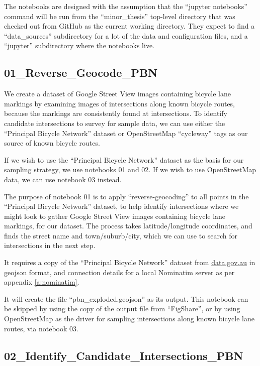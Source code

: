 \documentclass[11pt,twoside]{report}
\begin{document}
The notebooks are designed with the assumption that the ``jupyter notebooks'' command will be run from the ``minor\_thesis'' top-level directory that was checked out from GitHub as the current working directory.  They expect to find a ``data\_sources'' subdirectory for a lot of the data and configuration files, and a ``jupyter'' subdirectory where the notebooks live.

\subsection{01\_Reverse\_Geocode\_PBN}
\label{aj01}

We create a dataset of Google Street View images containing bicycle lane markings by examining images of intersections along known bicycle routes, because the markings are consistently found at intersections.  To identify candidate intersections to survey for sample data, we can use either the ``Principal Bicycle Network'' dataset or OpenStreetMap ``cycleway'' tags as our source of known bicycle routes.

If we wish to use the ``Principal Bicycle Network'' dataset as the basis for our sampling strategy, we use notebooks 01 and 02.  If we wish to use OpenStreetMap data, we can use notebook 03 instead.

The purpose of notebook 01 is to apply ``reverse-geocoding'' to all points in the ``Principal Bicycle Network'' dataset, to help identify intersections where we might look to gather Google Street View images containing bicycle lane markings, for our dataset.  The process takes latitude/longitude coordinates, and finds the street name and town/suburb/city, which we can use to search for intersections in the next step.

It requires a copy of the ``Principal Bicycle Network'' dataset from \url{data.gov.au} in geojson format, and connection details for a local Nominatim server as per appendix \ref{a:nominatim}.

It will create the file ``pbn\_exploded.geojson'' as its output.  This notebook can be skipped by using the copy of the output file from ``FigShare'', or by using OpenStreetMap as the driver for sampling intersections along known bicycle lane routes, via notebook 03.


\subsection{02\_Identify\_Candidate\_Intersections\_PBN}
\label{aj02}
\end{document}
